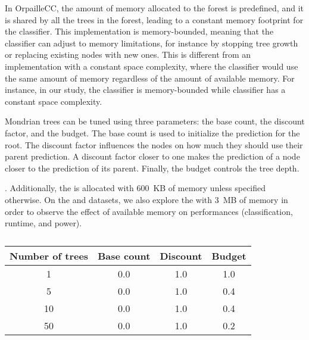 In OrpailleCC, the amount of memory allocated to the forest is predefined,
and it is shared by all the trees in the forest, leading to a constant
memory footprint for the classifier. This implementation is memory-bounded,
meaning that the classifier can adjust to memory limitations, for instance
by stopping tree growth or replacing existing nodes with new ones. This is
different from an implementation with a constant space complexity, where
the classifier would use the same amount of memory regardless of the
amount of available memory. For instance, in our study, the \mondrianforest
classifier is memory-bounded while \naivebayes classifier has a constant
space complexity.

Mondrian trees can be tuned using three parameters: the base count, the discount
factor, and the budget. The base count is used to initialize the prediction for
the root. The discount factor influences the nodes on how much they should use
their parent prediction. A discount factor closer to one makes the prediction of
a node closer to the prediction of its parent.  Finally, the budget controls the
tree depth.

.  Additionally, the \mondrianforest is allocated with 600~KB of memory
unless specified otherwise.  On the \banosdataset and \recofitdataset datasets,
we also explore the \mondrianforest with 3~MB of memory in order to observe the
effect of available memory on performances (classification, runtime, and power).

\begin{table}
		\begin{center}
		\begin{tabular}{|c|c|c|c|}
		\hline
		Number of trees & Base count & Discount & Budget\\
		\hline
		1               & 0.0        & 1.0      & 1.0 \\
		5               & 0.0        & 1.0      & 0.4 \\
		10              & 0.0        & 1.0      & 0.4 \\
		50              & 0.0        & 1.0      & 0.2 \\
		\hline
		\end{tabular}
		\end{center}
		\caption{}
		\label{tab:mondrian-parameters}
\end{table}

